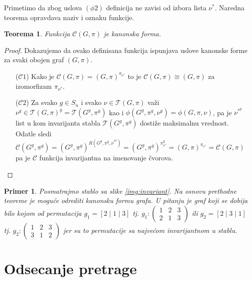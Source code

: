 \documentclass[12pt,oneside]{memoir}
\newtheorem{theorem}{Teorema}
\newtheorem{example}{Primer}
\theoremstyle{definition}
\begin{document}
  Primetimo da zbog uslova $(\phi2)$ definicija ne zavisi od izbora lista
  $\nu^*$. Naredna teorema opravdava naziv i oznaku funkcije.

  \begin{theorem}
	  Funkcija $\mathcal{C}(G, \pi)$ je kanonska forma.
  \end{theorem}

  \begin{proof}
		Dokazujemo da ovako definisana funkcija ispunjava uslove kanonske forme za
		svaki obojen graf $(G, \pi)$.
	  \begin{itemize}
		  \item [($\mathcal{C}1$)] Kako je $\mathcal{C}(G, \pi) = (G,
			  \pi)^{\pi_{\nu^*}}$ to je $\mathcal{C}(G, \pi) \cong (G, \pi)$ za
			  izomorfizam $\pi_{\nu^*}$.
		  \item [($\mathcal{C}2$)] Za svako $g \in S_n$ i svako $\nu \in
			  \mathcal{T}(G, \pi)$ važi $\nu^g \in \mathcal{T}(G, \pi)^g =
			  \mathcal{T}(G^g, \pi^g)$ kao i $\phi(G^g, \pi^g, \nu^g) = \phi(G,
			  \pi, \nu)$, pa je $\nu^*^g$ list u kom invarijanta stabla
			  $\mathcal{T}(G^g, \pi^g)$ dostiže maksimalnu vrednost.  Odatle
			  sledi $\mathcal{C}(G^g, \pi^g) = (G^g, \pi^g)^{R(G^g, \pi^g,
			  \nu^*^g)} = (G^g, \pi^g)^{\pi_{v^*}^g} = (G, \pi)^{\pi_{v^*}} =
			  \mathcal{C}(G, \pi)$ pa je $\mathcal{C}$ funkcija invarijantna na
			  imenovanje čvorova.
	  \end{itemize}
  \end{proof}

	\begin{example}
		Posmatrajmo stablo sa slike \ref{img:invariant}. Na osnovu prethodne
		teoreme je moguće odrediti kanonsku formu grafa. U pitanju je graf koji
		se dobija bilo kojom od permutacija $g_1 = [2 \mid 1 \mid 3]$ tj. $g_1 : \begin{pmatrix} 1 & 2 & 3 \\
		2 & 1 & 3\end{pmatrix}$ ili $g_2 = [2 \mid 3 \mid 1]$ tj. $g_2 : \begin{pmatrix} 1 & 2 & 3 \\ 3 &
		1 & 2 \end{pmatrix}$ jer su to permutacije sa najvećom invarijantnom u
		stablu.
	\end{example}

 \section{Odsecanje pretrage}
\end{document}
